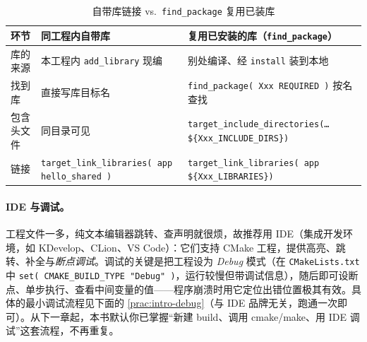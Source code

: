 \begin{table}[H]\centering\small
\caption{自带库链接 vs.\ \texttt{find\_package} 复用已装库}
\label{tab:intro-findpkg}
\begin{tabular}{p{} p{} p{}}
\toprule
环节 & 同工程内自带库 & 复用已安装的库（\texttt{find\_package}）\\
\midrule
库的来源 & 本工程内 \texttt{add\_library} 现编 & 别处编译、经 \texttt{install} 装到本地 \\
找到库 & 直接写库目标名 & \texttt{find\_package( Xxx REQUIRED )} 按名查找 \\
包含头文件 & 同目录可见 & \texttt{target\_include\_directories(\dots \$\{Xxx\_INCLUDE\_DIRS\})} \\
链接 & \texttt{target\_link\_libraries( app hello\_shared )} & \texttt{target\_link\_libraries( app \$\{Xxx\_LIBRARIES\})} \\
\bottomrule
\end{tabular}
\end{table}

\paragraph{IDE 与调试。}
工程文件一多，纯文本编辑器跳转、查声明就很烦，故推荐用 IDE（集成开发环境，如 KDevelop、CLion、VS Code）：它们支持 CMake 工程，提供高亮、跳转、补全与\emph{断点调试}。调试的关键是把工程设为 \emph{Debug} 模式（在 \texttt{CMakeLists.\allowbreak txt} 中 \texttt{set( CMAKE\_BUILD\_TYPE "Debug" )}，运行较慢但带调试信息），随后即可设断点、单步执行、查看中间变量的值——程序崩溃时用它定位出错位置极其有效。具体的最小调试流程见下面的 \cref{prac:intro-debug}（与 IDE 品牌无关，跑通一次即可）。从下一章起，本书默认你已掌握“新建 build、调用 cmake/make、用 IDE 调试”这套流程，不再重复。

